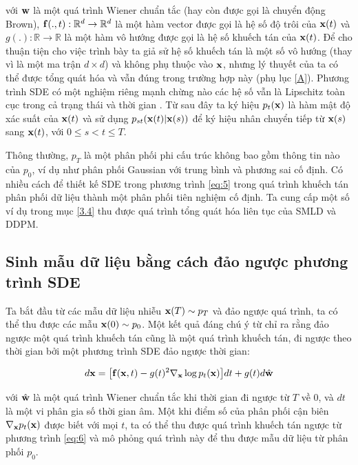 \documentclass{article} %
\begin{document}
với $\bold{w}$ là một quá trình Wiener chuẩn tắc (hay còn được gọi là chuyển động Brown), $\bold{f}(.,t): \mathbb{R}^d \rightarrow \mathbb{R}^d$ là một hàm vector được gọi là hệ số độ trôi của $\bold{x}(t)$ và $g(.): \mathbb{R} \rightarrow \mathbb{R}$ là một hàm vô hướng được gọi là hệ số khuếch tán của $\bold{x}(t)$.
Để cho thuận tiện cho việc trình bày ta giả sử hệ số khuếch tán là một số vô hướng (thay vì là một ma trận $d \times d$) và không phụ thuộc vào $\bold{x}$, nhưng lý thuyết của ta có thể được tổng quát hóa và vẫn đúng trong trường hợp này (phụ lục \ref{A}).
Phương trình SDE có một nghiệm riêng mạnh chừng nào các hệ số vẫn là Lipschitz toàn cục trong cả trạng thái và thời gian \citep{oksendal2003stochastic}.
Từ sau đây ta ký hiệu $p_t (\bold{x})$ là hàm mật độ xác suất của $\bold{x}(t)$ và sử dụng $p_{st}(\bold{x}(t) \vert \bold{x}(s))$ để ký hiệu nhân chuyển tiếp từ $\bold{x}(s)$ sang $\bold{x}(t)$, với $0 \leq s < t \leq T$.

Thông thường, $p_T$ là một phân phối phi cấu trúc không bao gồm thông tin nào của $p_0$, ví dụ như phân phối Gaussian với trung bình và phương sai cố định.
Có nhiều cách để thiết kế SDE trong phương trình \ref{eq:5} trong quá trình khuếch tán phân phối dữ liệu thành một phân phối tiên nghiệm cố định.
Ta cung cấp một số ví dụ trong mục \ref{3.4} thu được quá trình tổng quát hóa liên tục của SMLD và DDPM.

\subsection{Sinh mẫu dữ liệu bằng cách đảo ngược phương trình SDE} \label{3.2}

Ta bắt đầu từ các mẫu dữ liệu nhiễu $\bold{x}(T) \sim p_T$ và đảo ngược quá trình, ta có thể thu được các mẫu $\bold{x}(0) \sim p_0$.
Một kết quả đáng chú ý từ \citep{anderson1982reverse} chỉ ra rằng đảo ngược một quá trình khuếch tán cũng là một quá trình khuếch tán, đi ngược theo thời gian bởi một phương trình SDE đảo ngược thời gian:

\begin{equation} \label{eq:6}
    d \bold{x} = \big \lbrack \bold{f}(\bold{x}, t) - g(t)^2 \nabla_{\bold{x}} \log p_t (\bold{x}) \big \rbrack dt + g(t) d \hat{\bold{w}}
\end{equation}

với $\hat{\bold{w}}$ là một quá trình Wiener chuẩn tắc khi thời gian đi ngược từ $T$ về $0$, và $dt$ là một vi phân gia số thời gian âm.
Một khi điểm số của phân phối cận biên $\nabla_{\bold{x}} p_t(\bold{x})$ được biết với mọi $t$, ta có thể thu được quá trình khuếch tán ngược từ phương trình \ref{eq:6} và mô phỏng quá trình này để thu được mẫu dữ liệu từ phân phối $p_0$.
\end{document}
